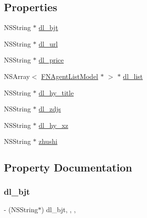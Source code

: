 \subsection*{Properties}
\begin{DoxyCompactItemize}
\item 
N\+S\+String $\ast$ \mbox{\hyperlink{interface_f_n_m_c_agent_apply_show_model_aefffd6653231ba4aaacc9e8f33a5650d}{dl\+\_\+bjt}}
\item 
N\+S\+String $\ast$ \mbox{\hyperlink{interface_f_n_m_c_agent_apply_show_model_a2f981419df8ff3c2af3419e8490718b4}{dl\+\_\+url}}
\item 
N\+S\+String $\ast$ \mbox{\hyperlink{interface_f_n_m_c_agent_apply_show_model_a70dee939a8f48f71346195f8e2b984a2}{dl\+\_\+price}}
\item 
N\+S\+Array$<$ \mbox{\hyperlink{interface_f_n_agent_list_model}{F\+N\+Agent\+List\+Model}} $\ast$ $>$ $\ast$ \mbox{\hyperlink{interface_f_n_m_c_agent_apply_show_model_ad4878a29d45acd3b496914b83e44fda8}{dl\+\_\+list}}
\item 
N\+S\+String $\ast$ \mbox{\hyperlink{interface_f_n_m_c_agent_apply_show_model_a1be3e42f9368b3b2798522069bb25213}{dl\+\_\+hy\+\_\+title}}
\item 
N\+S\+String $\ast$ \mbox{\hyperlink{interface_f_n_m_c_agent_apply_show_model_a49bd1f6a4be1579922d3638642314d57}{dl\+\_\+zdjs}}
\item 
N\+S\+String $\ast$ \mbox{\hyperlink{interface_f_n_m_c_agent_apply_show_model_a40f734639d05ca4d09a7d5d01eabf372}{dl\+\_\+hy\+\_\+xz}}
\item 
N\+S\+String $\ast$ \mbox{\hyperlink{interface_f_n_m_c_agent_apply_show_model_a5eb5c9d9d6249b34b3e288c81550f0d5}{zhushi}}
\end{DoxyCompactItemize}


\subsection{Property Documentation}
\mbox{\label{interface_f_n_m_c_agent_apply_show_model_aefffd6653231ba4aaacc9e8f33a5650d}} 
\subsubsection{\texorpdfstring{dl\+\_\+bjt}{dl\_bjt}}
{\footnotesize\ttfamily -\/ (N\+S\+String$\ast$) dl\+\_\+bjt\hspace{0.3cm}{\ttfamily [read]}, {\ttfamily [write]}, {\ttfamily [nonatomic]}, {\ttfamily [copy]}}

